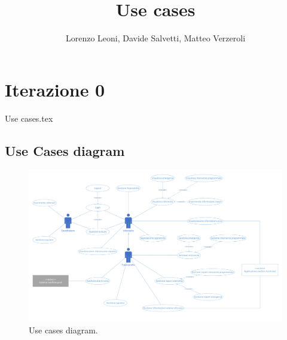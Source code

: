 \documentclass[
		a4paper,
		cleardoublepage=empty,
		headings=twolinechapter,
		numbers=autoenddot,
]{article}
\title{Use cases}
\author{Lorenzo Leoni, Davide Salvetti, Matteo Verzeroli}
\begin{document}
	\maketitle
	\section{Iterazione 0}
	{Use cases.tex}
	
	\clearpage
	\subsection{Use Cases diagram}
	
	\begin{figure}
		\centering
		\includegraphics[width=0.9\linewidth]{OtherFiles/Use cases diagram}
		\caption{Use cases diagram.}
		\label{fig:UseCaseDiagram}
	\end{figure}
\end{document}
